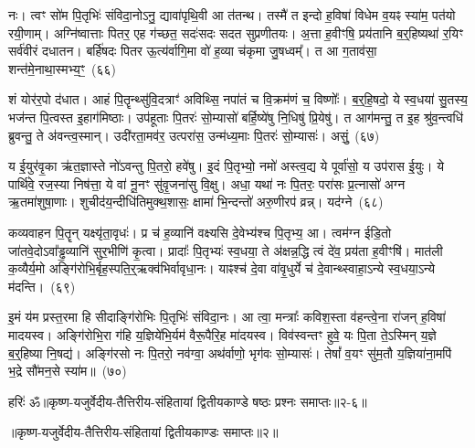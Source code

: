 नः। त्वꣳ सो॑म पि॒तृभिः॑ संविदा॒नो\-ऽनु॒ द्यावा॑\-पृथि॒वी आ त॑तन्थ। तस्मै॑ त इन्दो ह॒विषा॑ विधेम व॒यꣴ स्या॑म॒ पत॑यो रयी॒णाम्। अग्नि॑ष्वात्ताः पितर॒ एह ग॑च्छत॒ सदः॑सदः सदत सुप्रणीतयः। अ॒त्ता ह॒वीꣳषि॒ प्रय॑तानि ब॒र्॒\mbox{}हिष्यथा॑ र॒यिꣳ सर्व॑वीरं दधातन। बर्\mbox{}हि॑षदः पितर ऊ॒त्य॑र्वागि॒मा वो॑ ह॒व्या च॑कृमा जु॒षध्वम्᳚। त आ ग॒ताव॑सा॒ शन्त॑मे॒नाथा॒स्मभ्य॒ꣳ॒~(६६)\ip

शं योर॑र॒पो द॑धात। आहं पि॒तॄन्थ्सु॑वि॒दत्राꣳ॑ अविथ्सि॒ नपा॑तं च वि॒क्रम॑णं च॒ विष्णोः᳚। ब॒र्॒\mbox{}हि॒षदो॒ ये स्व॒धया॑ सु॒तस्य॒ भज॑न्त पि॒त्वस्त इ॒हाग॑मिष्ठाः। उप॑हूताः पि॒तरः॑ सो॒म्यासो॑ बर्\mbox{}हि॒ष्ये॑षु नि॒धिषु॑ प्रि॒येषु॑। त आग॑मन्तु॒ त इ॒ह श्रु॑व॒न्त्वधि॑ ब्रुवन्तु॒ ते अ॑वन्त्व॒स्मान्। उदी॑रता॒मव॑र॒ उत्परा॑स॒ उन्म॑ध्य॒माः पि॒तरः॑ सो॒म्यासः॑। असुं॒~(६७)\ip

य ई॒युर॑वृ॒का ऋ॑त॒ज्ञास्ते नो॑\-ऽवन्तु पि॒तरो॒ हवे॑षु। इ॒दं पि॒तृभ्यो॒ नमो॑ अस्त्व॒द्य ये पूर्वा॑सो॒ य उप॑रास ई॒युः। ये पार्थि॑वे॒ रज॒स्या निष॑त्ता॒ ये वा॑ नू॒नꣳ सु॑वृ॒जना॑सु वि॒क्षु। अधा॒ यथा॑ नः पि॒तरः॒ परा॑सः प्र॒त्नासो॑ अग्न ऋ॒तमा॑शुषा॒णाः। शुचीद॑य॒न्दीधि॑तिमुक्थ॒शासः॒ क्षामा॑ भि॒न्दन्तो॑ अरु॒णीरप॑ व्रन्न्। यद॑ग्ने~(६८)\ip

कव्यवाहन पि॒तॄन् यक्ष्यृ॑ता॒वृधः॑। प्र च॑ ह॒व्यानि॑ वक्ष्यसि दे॒वेभ्य॑श्च पि॒तृभ्य॒ आ। त्वम॑ग्न ईडि॒तो जा॑तवे॒दो\-ऽवा᳚ड्ढ॒व्यानि॑ सुर॒भीणि॑ कृ॒त्वा। प्रादाः᳚ पि॒तृभ्यः॑ स्व॒धया॒ ते अ॑क्षन्न॒द्धि त्वं दे॑व॒ प्रय॑ता ह॒वीꣳषि॑। मात॑ली क॒व्यैर्य॒मो अङ्गि॑रोभि॒र्बृह॒स्पति॒र्॒\mbox{}ऋक्व॑भिर्वावृधा॒नः। याꣴश्च॑ दे॒वा वा॑वृ॒धुर्ये च॑ दे॒वान्थ्\-स्वाहा॒\-ऽन्ये स्व॒धया॒\-ऽन्ये म॑दन्ति।~(६९)\ip

इ॒मं य॑म प्रस्त॒रमा हि सीदाङ्गि॑रोभिः पि॒तृभिः॑ संविदा॒नः। आ त्वा॒ मन्त्राः᳚ कविश॒स्ता व॑हन्त्वे॒ना रा॑जन् ह॒विषा॑ मादयस्व। अङ्गि॑रोभि॒रा ग॑हि य॒ज्ञिये॑भि॒र्यम॑ वैरू॒पैरि॒ह मा॑दयस्व। विव॑स्वन्तꣳ हुवे॒ यः पि॒ता ते॒\-ऽस्मिन् य॒ज्ञे ब॒र्॒\mbox{}हिष्या नि॒षद्य॑। अङ्गि॑रसो नः पि॒तरो॒ नव॑ग्वा॒ अथ॑र्वाणो॒ भृग॑वः सो॒म्यासः॑। तेषां᳚ व॒यꣳ सु॑म॒तौ य॒ज्ञिया॑ना॒मपि॑ भ॒द्रे सौ॑मन॒से स्या॑म॥~(७०)\ip

{\anuvakamend[{भ॒वा॒स्मभ्य॒मसुं॒ यद॑ग्ने मदन्ति सौमन॒स एक॑ञ्च}]}%

{हरिः॑ ॐ}{॥कृष्ण-यजुर्वेदीय-तैत्तिरीय-संहितायां द्वितीयकाण्डे षष्ठः प्रश्नः समाप्तः॥२-६॥}

\centerline{॥कृष्ण-यजुर्वेदीय-तैत्तिरीय-संहितायां द्वितीयकाण्डः समाप्तः॥२॥}

\medskip

\centerline{\hyperref[sec:startkanda2]{\closesection}}


